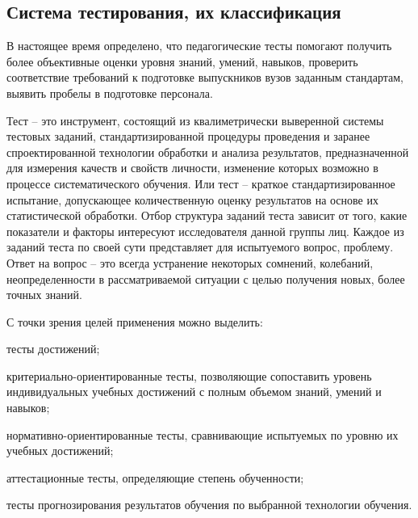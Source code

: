 \subsection{Система тестирования, их классификация}

В настоящее время определено, что педагогические тесты помогают
получить более объективные оценки уровня знаний, умений, навыков,
проверить соответствие требований к подготовке выпускников вузов заданным
стандартам, выявить пробелы в подготовке персонала.

Тест – это инструмент, состоящий из квалиметрически выверенной системы тестовых заданий, стандартизированной процедуры проведения и заранее спроектированной технологии обработки и анализа результатов, предназначенной для измерения качеств и свойств личности, изменение которых возможно в процессе систематического обучения. Или тест – краткое стандартизированное испытание, допускающее количественную оценку результатов на основе их
статистической обработки. Отбор структура заданий теста зависит от того, какие показатели и факторы интересуют исследователя данной группы лиц. Каждое из заданий теста по своей сути представляет для испытуемого вопрос, проблему. Ответ на вопрос – это всегда устранение некоторых сомнений, колебаний, неопределенности в рассматриваемой ситуации с целью получения новых, более точных знаний.

С точки зрения целей применения можно выделить:

тесты достижений;

критериально-ориентированные тесты, позволяющие сопоставить
уровень индивидуальных учебных достижений с полным объемом знаний,
умений и навыков;

нормативно-ориентированные тесты, сравнивающие испытуемых по
уровню их учебных достижений;

аттестационные тесты, определяющие степень обученности;

тесты прогнозирования результатов обучения по выбранной
технологии обучения.